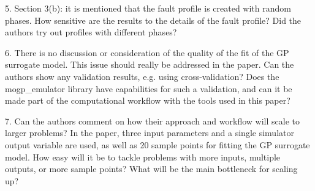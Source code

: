 \documentclass{article}
\begin{document}
5. Section 3(b): it is mentioned that the fault profile is created with random phases. How sensitive are the results to the details of the fault profile? Did the authors try out profiles with different phases?

6. There is no discussion or consideration of the quality of the fit of the GP surrogate model. This issue should really be addressed in the paper. Can the authors show any validation results, e.g. using cross-validation? Does the mogp\_emulator library have capabilities for such a validation, and can it be made part of the computational workflow with the tools used in this paper?

7. Can the authors comment on how their approach and workflow will scale to larger problems? In the paper, three input parameters and a single simulator output variable are used, as well as 20 sample points for fitting the GP surrogate model. How easy will it be to tackle problems with more inputs, multiple outputs, or more sample points? What will be the main bottleneck for scaling up?
\end{document}
